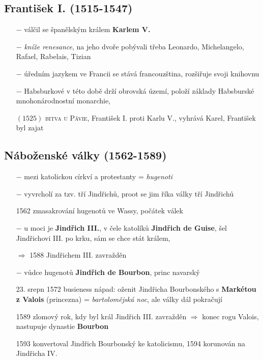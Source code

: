 \documentclass{article}
\begin{document}
\subsection*{František I. (1515-1547)}
\begin{itemize}
    \vspace{-0.5em}
    \setlength\itemsep{0.15em}
    \item[$-$] válčil se španělským králem \textbf{Karlem V.}
    \item[$-$] \textit{kníže renesance}, na jeho dvoře pobývali třeba Leonardo, Michelangelo, Rafael, Rabelais, Tizian
    \item[$-$] úředním jazykem ve Francii se stává francouzština, rozšiřuje svoji knihovnu
    \item[$-$] Habsburkové v této době drží obrovská území, položí základy Habsburské mnohonárodnostní monarchie, 
    \item[$(1525)$]\textsc{bitva u Pávie}, František I. proti Karlu V., vyhrává Karel, František byl zajat
\end{itemize}


\subsection*{Náboženské války (1562-1589)}
\begin{itemize}
    \vspace{-0.5em}
    \setlength\itemsep{0.15em}
    \item[$-$] mezi katolickou církví a protestanty = \textit{hugenoti}
    \item[$-$] vyvrcholí za tzv. tří Jindřichů, proot se jim říka války tří Jindřichů
    \item[1562] zmasakrování hugenotů ve Wassy, počátek válek
    \item[$-$] u moci je \textbf{Jindřich III.}, v čele katolíků \textbf{Jindřich de Guise}, šel Jindřichovi III. po krku, sám se chce stát králem,
    \item[$\Rightarrow$] 1588 Jindřichem III. zavražděn
    \item[$-$] vůdce hugenotů \textbf{Jindřich de Bourbon}, princ navarský
    \item[23. srepn 1572] busieness nápad: oženit Jindřicha Bourbonského s \textbf{Markétou z Valois} (princezna) = \textit{bartolomějská noc}, ale války dál pokračují
    \item[1589] zlomový rok, kdy byl král Jindřich III. zavražděn $\Rightarrow$ konec rogu Valois, nastupuje dynastie \textbf{Bourbon}
    \item[1593] konvertoval Jindřich Bourbonský ke katolicismu, 1594 korunován na Jindřicha IV.
\end{itemize}
\end{document}
